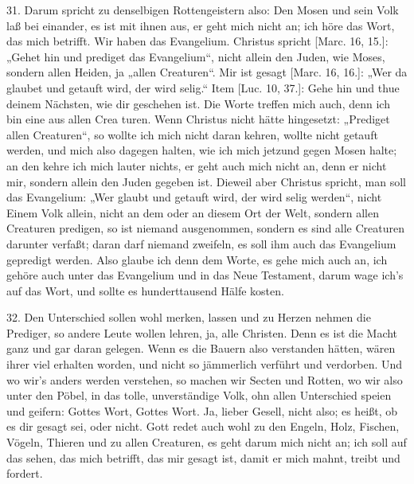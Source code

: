 31. Darum spricht zu denselbigen Rottengeistern also: Den Mosen und sein Volk laß bei einander, es ist mit ihnen aus, er geht mich nicht an; ich höre das Wort, das mich betrifft. Wir haben das Evangelium. Christus spricht [Marc. 16, 15.]: „Gehet hin und prediget das Evangelium“, nicht allein den Juden, wie Moses, sondern allen Heiden, ja „allen Creaturen“. Mir ist gesagt [Marc. 16, 16.]: „Wer da glaubet und getauft wird, der wird selig.“ Item [Luc. 10, 37.]: Gehe hin und thue deinem Nächsten, wie dir geschehen ist. Die Worte treffen mich auch, denn ich bin eine aus allen Crea
turen. Wenn Christus nicht hätte hingesetzt: „Prediget allen Creaturen“, so wollte ich mich nicht daran kehren, wollte nicht getauft werden, und mich also dagegen halten, wie ich mich jetzund gegen Mosen halte; an den kehre ich mich lauter nichts, er geht auch mich nicht an, denn er nicht mir, sondern allein den Juden gegeben ist. Dieweil aber Christus spricht, man soll das Evangelium: „Wer glaubt und getauft wird, der wird selig werden“, nicht Einem Volk allein, nicht an dem oder an diesem Ort der Welt, sondern allen Creaturen predigen, so ist niemand ausgenommen, sondern es sind alle Creaturen darunter verfaßt; daran darf niemand zweifeln, es soll ihm auch das Evangelium gepredigt werden. Also glaube ich denn dem Worte, es gehe mich auch an, ich gehöre auch unter das Evangelium und in das Neue Testament, darum wage ich’s auf das Wort, und sollte es hunderttausend Hälfe kosten.

32. Den Unterschied sollen wohl merken, lassen und zu Herzen nehmen die Prediger, so andere Leute wollen lehren, ja, alle Christen. Denn es ist die Macht ganz und gar daran gelegen. Wenn es die Bauern also verstanden hätten, wären ihrer viel erhalten worden, und nicht so jämmerlich verführt und verdorben. Und wo wir’s anders werden verstehen, so machen wir Secten und Rotten, wo wir also unter den Pöbel, in das tolle, unverständige Volk, ohn allen Unterschied speien und geifern: Gottes Wort, Gottes Wort. Ja, lieber Gesell, nicht also; es heißt, ob es dir gesagt sei, oder nicht. Gott redet auch wohl zu den Engeln, Holz, Fischen, Vögeln, Thieren und zu allen Creaturen, es geht darum mich nicht an; ich soll auf das sehen, das mich betrifft, das mir gesagt ist, damit er mich mahnt, treibt und fordert.


